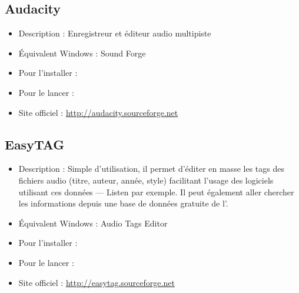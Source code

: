 \subsection{Audacity}
\begingroup
{}
\begin{itemize}
\item Description : Enregistreur et éditeur audio multipiste{\par}
\item Équivalent Windows : Sound Forge{\par}
\item Pour l'installer : 
\item Pour le lancer : 
\item Site officiel : \url{http://audacity.sourceforge.net}{\par}
\end{itemize}
\subsection{EasyTAG}
\begin{itemize}
\begingroup
{}
\item Description : Simple d'utilisation, il permet d'éditer en masse les tags des fichiers audio (titre, auteur, année, style) facilitant l'usage des  logiciels utilisant ces données --- Listen par exemple. Il peut également aller chercher les informations depuis une base de données gratuite de l'.{\par}
\endgroup
\item Équivalent Windows : Audio Tags Editor
\item Pour l'installer : 
\item Pour le lancer : 
\item Site officiel : \url{http://easytag.sourceforge.net}
\end{itemize}
